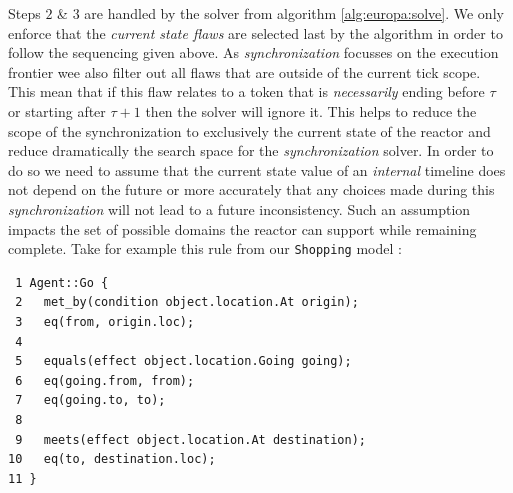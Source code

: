 
Steps $2$ \& $3$ are handled by the \eu solver from algorithm
\ref{alg:europa:solve}. We only enforce that the {\em current state
  flaws} are selected last by the algorithm in order to follow the
sequencing given above. As {\em synchronization} focusses on the
execution frontier wee also filter out all flaws that are outside of
the current tick scope. This mean that if this flaw relates to a token
that is {\em necessarily} ending before $\tau$ or starting after
$\tau+1$ then the solver will ignore it. This helps to reduce the
scope of the synchronization to exclusively the current state of the
reactor and reduce dramatically the search space for the {\em
  synchronization} solver. In order to do so we need to assume 
that the current state value of an {\em internal} timeline does not 
depend on the future or more accurately that any choices made during 
this {\em synchronization} will not lead to a future inconsistency. 
Such an assumption impacts the set of possible domains the reactor 
can support while remaining complete. Take for  example this rule from 
our \texttt{Shopping} model :

\begin{verbatim}
 1 Agent::Go {
 2   met_by(condition object.location.At origin);
 3   eq(from, origin.loc);
 4
 5   equals(effect object.location.Going going);
 6   eq(going.from, from);
 7   eq(going.to, to);
 8   
 9   meets(effect object.location.At destination);
10   eq(to, destination.loc);
11 }
\end{verbatim}

